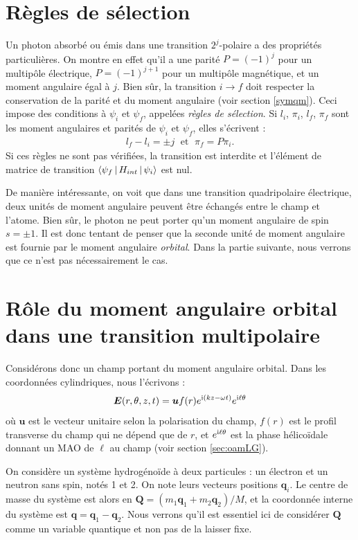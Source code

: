 \section{Règles de sélection}
Un photon absorbé ou émis dans une transition $2^j$-polaire a des propriétés particulières. On montre en effet  qu'il a une parité $P=(-1)^j$ pour un multipôle électrique, $P=(-1)^{j+1}$ pour un multipôle magnétique, et un moment angulaire égal à $j$. Bien sûr, la transition $i\rightarrow f$ doit respecter la conservation de la parité et du moment angulaire (voir section \ref{symqm}). Ceci impose des conditions à $\psi_i$ et $\psi_f$, appelées \textit{règles de sélection}. Si $l_i$, $\pi_i$, $l_f$, $\pi_f$ sont les moment angulaires et parités de $\psi_i$ et $\psi_f$, elles s'écrivent :
\begin{align}
l_f-l_i=\pm j\;\text{ et }\;\pi_f=P\pi_i.
\end{align}
Si ces règles ne sont pas vérifiées, la transition est interdite et l'élément de matrice de transition $\Braket{\psi_f|H_{int}|\psi_i}$ est nul.

De manière intéressante, on voit que dans une transition quadripolaire électrique, deux unités de moment angulaire peuvent être échangés entre le champ et l'atome. Bien sûr, le photon ne peut porter qu'un moment angulaire de spin $s=\pm 1$. Il est donc tentant de penser que la seconde unité de moment angulaire est fournie par le moment angulaire \textit{orbital}. Dans la partie suivante, nous verrons que ce n'est pas nécessairement le cas.

\section{Rôle du moment angulaire orbital dans une transition multipolaire}
Considérons donc un champ portant du moment angulaire orbital. Dans les coordonnées cylindriques, nous l'écrivons :
\[\bm{E}(r,\theta,z,t) = \bm{u} f(r)e^{\mathrm{i}(kz-\omega t)}e^{\mathrm{i}\ell\theta}\]
où $\bm{u}$ est le vecteur unitaire selon la polarisation du champ, $f(r)$ est le profil transverse du champ qui ne dépend que de $r$, et $e^{\mathrm{i}\ell\theta}$ est la phase hélicoïdale donnant un MAO de $\ell$ au champ (voir section \ref{sec:oamLG}).

On considère un système hydrogénoïde à deux particules : un électron et un neutron sans spin, notés 1 et 2. On note leurs vecteurs positions $\bm{q}_i$. Le centre de masse du système est alors en $\bm{Q} = (m_1 \bm{q}_1+m_2 \bm{q}_2)/M$, et la coordonnée interne du système est $\bm{q} = \bm{q}_1-\bm{q}_2$. Nous verrons qu'il est essentiel ici de considérer $\bm{Q}$ comme un variable quantique et non pas de la laisser fixe.

